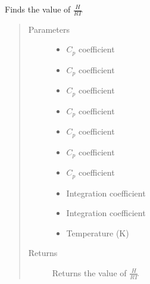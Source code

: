 \documentclass[letterpaper,10pt,english]{sphinxmanual}
\begin{document}
\begin{fulllineitems}
Finds the value of \(\frac{H}{RT}\)
\begin{quote}\begin{description}
\item[{Parameters}] \leavevmode\begin{itemize}
\item {} 
 \textendash{} \(C_p\) coefficient

\item {} 
 \textendash{} \(C_p\) coefficient

\item {} 
 \textendash{} \(C_p\) coefficient

\item {} 
 \textendash{} \(C_p\) coefficient

\item {} 
 \textendash{} \(C_p\) coefficient

\item {} 
 \textendash{} \(C_p\) coefficient

\item {} 
 \textendash{} \(C_p\) coefficient

\item {} 
 \textendash{} Integration coefficient

\item {} 
 \textendash{} Integration coefficient

\item {} 
 \textendash{} Temperature (K)

\end{itemize}

\item[{Returns}] \leavevmode
Returns the value of \(\frac{H}{RT}\)

\end{description}\end{quote}

\end{fulllineitems}
\end{document}
